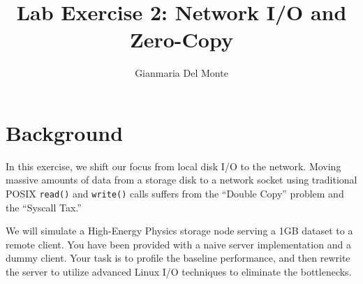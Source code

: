 \documentclass[11pt, a4paper]{article}
\title{\textbf{Lab Exercise 2: Network I/O and Zero-Copy}}
\author{Gianmaria Del Monte}
\date{}
\begin{document}
\maketitle

\section*{Background}
In this exercise, we shift our focus from local disk I/O to the network. Moving massive amounts of data from a storage disk to a network socket using traditional POSIX \texttt{read()} and \texttt{write()} calls suffers from the ``Double Copy'' problem and the ``Syscall Tax.'' 

We will simulate a High-Energy Physics storage node serving a 1GB dataset to a remote client. You have been provided with a naive server implementation and a dummy client. Your task is to profile the baseline performance, and then rewrite the server to utilize advanced Linux I/O techniques to eliminate the bottlenecks.
\end{document}
